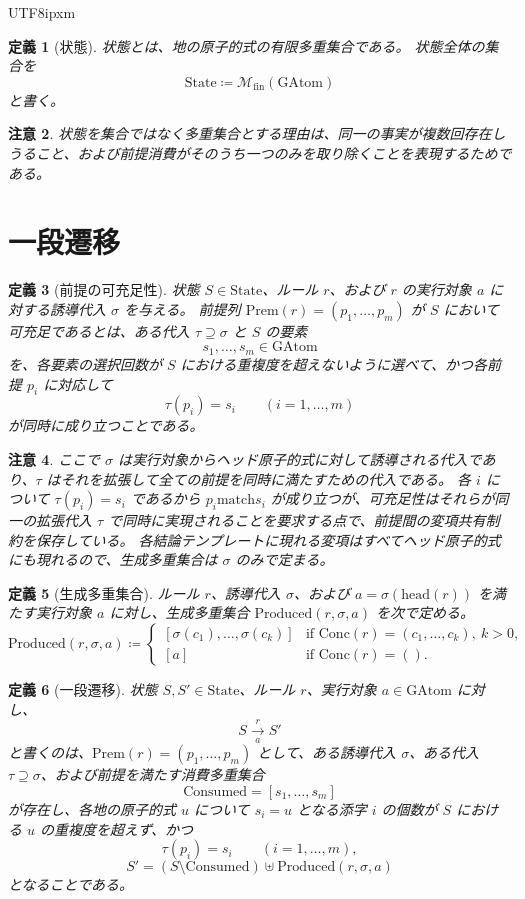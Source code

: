 \documentclass[a4paper,11pt]{bxjsarticle}
\newcommand{\JPCJKfamily}{ipxm}
\newtheorem{definition}{定義}[section]
\newtheorem{remark}[definition]{注意}
\newcommand{\GAtom}{\mathrm{GAtom}}
\newcommand{\State}{\mathrm{State}}
\newcommand{\headsym}{\mathrm{head}}
\newcommand{\Prem}{\mathrm{Prem}}
\newcommand{\Conc}{\mathrm{Conc}}
\newcommand{\matchrel}{\mathrel{\mathrm{match}}}
\newcommand{\MS}{\mathbin{\uplus}}
\newcommand{\powfin}{\mathcal{M}_{\mathrm{fin}}}
\newcommand{\Produced}{\mathrm{Produced}}
\newcommand{\Consumed}{\mathrm{Consumed}}
\begin{document}
\begin{CJK}{UTF8}{\JPCJKfamily}
\begin{definition}[状態]
状態とは、地の原子的式の有限多重集合である。
状態全体の集合を
\[
\State \coloneqq \powfin(\GAtom)
\]
と書く。
\end{definition}

\begin{remark}
状態を集合ではなく多重集合とする理由は、同一の事実が複数回存在しうること、および前提消費がそのうち一つのみを取り除くことを表現するためである。
\end{remark}

\section{一段遷移}

\begin{definition}[前提の可充足性]
状態 $S \in \State$、ルール $r$、および $r$ の実行対象 $a$ に対する誘導代入 $\sigma$ を与える。
前提列 $\Prem(r)=(p_1,\dots,p_m)$ が $S$ において\emph{可充足}であるとは、ある代入 $\tau \supseteq \sigma$ と $S$ の要素
\[
s_1,\dots,s_m \in \GAtom
\]
を、各要素の選択回数が $S$ における重複度を超えないように選べて、かつ各前提 $p_i$ に対応して
\[
\tau(p_i)=s_i \qquad (i=1,\dots,m)
\]
が同時に成り立つことである。
\end{definition}

\begin{remark}
ここで $\sigma$ は実行対象からヘッド原子的式に対して誘導される代入であり、$\tau$ はそれを拡張して全ての前提を同時に満たすための代入である。
各 $i$ について $\tau(p_i)=s_i$ であるから $p_i \matchrel s_i$ が成り立つが、可充足性はそれらが\emph{同一の}拡張代入 $\tau$ で同時に実現されることを要求する点で、前提間の変項共有制約を保存している。
各結論テンプレートに現れる変項はすべてヘッド原子的式にも現れるので、生成多重集合は $\sigma$ のみで定まる。
\end{remark}

\begin{definition}[生成多重集合]
ルール $r$、誘導代入 $\sigma$、および $a=\sigma(\headsym(r))$ を満たす実行対象 $a$ に対し、生成多重集合 $\Produced(r,\sigma,a)$ を次で定める。
\[
\Produced(r,\sigma,a) \coloneqq
\begin{cases}
[\sigma(c_1),\dots,\sigma(c_k)] & \text{if } \Conc(r)=(c_1,\dots,c_k),\ k>0,\\
[a] & \text{if } \Conc(r)=().
\end{cases}
\]
\end{definition}

\begin{definition}[一段遷移]
状態 $S,S' \in \State$、ルール $r$、実行対象 $a \in \GAtom$ に対し、
\[
S \xrightarrow[a]{r} S'
\]
と書くのは、$\Prem(r)=(p_1,\dots,p_m)$ として、ある誘導代入 $\sigma$、ある代入 $\tau \supseteq \sigma$、および前提を満たす消費多重集合
\[
\Consumed = [s_1,\dots,s_m]
\]
が存在し、各地の原子的式 $u$ について $s_i=u$ となる添字 $i$ の個数が $S$ における $u$ の重複度を超えず、かつ
\[
\tau(p_i)=s_i \qquad (i=1,\dots,m),
\]
\[
S' = (S \setminus \Consumed) \MS \Produced(r,\sigma,a)
\]
となることである。
\end{definition}


\end{CJK}
\end{document}

